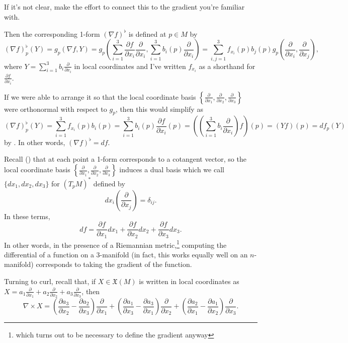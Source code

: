 \begin{exercise}
	If it's not clear, make the effort to connect this to the gradient you're familiar with.
\end{exercise}

Then the corresponding 1-form $(\nabla f)^\flat$ is defined at $p \in M$ by
\[
	(\nabla f)_p^\flat(Y) = g_p(\nabla f, Y) = g_p\left(\sum_{i=1}^3 \frac{\partial f}{\partial x_i} \frac{\partial}{\partial x_i}, \sum_{i=1}^3 b_i(p) \frac{\partial }{\partial x_i}\right) = \sum_{i,j=1}^3 f_{x_i}(p) b_j(p) g_p\left(\frac{\partial }{\partial x_i}, \frac{\partial }{\partial x_j}\right),
\]
where $Y = \sum_{i=1}^3 b_i \frac{\partial }{\partial x_i}$ in local coordinates and I've written $f_{x_i}$ as a shorthand for $\frac{\partial f}{\partial x_i}$.

If we were able to arrange it so that the local coordinate basis $\left\{ \frac{\partial }{\partial x_1},\frac{\partial }{\partial x_2},\frac{\partial }{\partial x_3}\right\}$ were orthonormal with respect to $g_p$, then this would simplify as
\[
	(\nabla f)_p^\flat(Y) = \sum_{i=1}^3 f_{x_i}(p) b_i(p) = \sum_{i=1}^3  b_i(p) \frac{\partial f}{\partial x_i}(p) = \left(\left(\sum_{i=1}^3  b_i \frac{\partial}{\partial x_i}\right)f\right)(p) = (Yf)(p) = df_p(Y)
\]
by . In other words, $(\nabla f)^\flat = df$.

Recall () that at each point a 1-form corresponds to a cotangent vector, so the local coordinate basis $\left\{ \frac{\partial }{\partial x_1},\frac{\partial }{\partial x_2},\frac{\partial }{\partial x_3}\right\}$ induces a dual basis which we call $\{dx_1, dx_2, dx_3\}$ for $\left(T_pM\right)^\ast$ defined by 
\[
	dx_i\left(\frac{\partial}{\partial x_j}\right) = \delta_{ij}.
\]
In these terms, 
\[
	df = \frac{\partial f}{\partial x_1} dx_1 + \frac{\partial f}{\partial x_2} dx_2 + \frac{\partial f}{\partial x_3}dx_3.
\]
In other words, in the presence of a Riemannian metric,\footnote{which turns out to be necessary to define the gradient anyway} computing the differential of a function on a 3-manifold (in fact, this works equally well on an $n$-manifold) corresponds to taking the gradient of the function.

Turning to curl, recall that, if $X \in \mathfrak{X}(M)$ is written in local coordinates as $X = a_1 \frac{\partial }{\partial x_1} + a_2 \frac{\partial }{\partial x_2} + a_3 \frac{\partial }{\partial x_3}$, then
\[
	\nabla \times X = \left(\frac{\partial a_3}{\partial x_2} - \frac{\partial a_2}{\partial x_3} \right)\frac{\partial }{\partial x_1} + \left( \frac{\partial a_1}{\partial x_3} - \frac{\partial a_3}{\partial x_1} \right) \frac{\partial }{\partial x_2} + \left( \frac{\partial a_2}{\partial x_1} - \frac{\partial a_1}{\partial x_2} \right) \frac{\partial }{\partial x_3}.
\]

